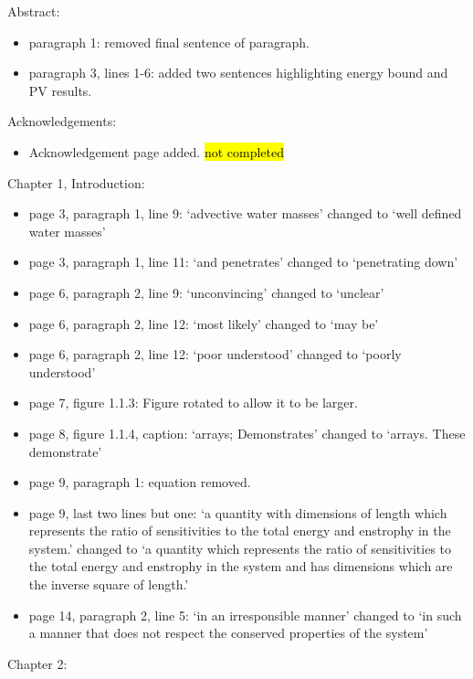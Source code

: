 \documentclass[10pt,a4paper]{article}
\begin{document}
	
	
	Abstract:
	\begin{itemize}
		\item paragraph 1: removed final sentence of paragraph.
		
		\item paragraph 3, lines 1-6: added two sentences highlighting energy bound and PV results.  
	\end{itemize}
	
	Acknowledgements:
	\begin{itemize}
		\item Acknowledgement page added. \hl{not completed}
	\end{itemize}
	
	Chapter 1, Introduction:
	\begin{itemize}
		\item page 3, paragraph 1, line 9: `advective water masses' changed to `well
		defined water masses'
		\item page 3, paragraph 1, line 11: `and penetrates'  changed to `penetrating down'
		\item page 6, paragraph 2, line 9:  `unconvincing' changed to `unclear'
		\item page 6, paragraph 2, line 12:  `most likely' changed to `may be'
		\item page 6, paragraph 2, line 12:  `poor understood' changed to `poorly understood'
		\item page 7, figure 1.1.3: Figure rotated to allow it to be larger.
		\item page 8, figure 1.1.4, caption: `arrays; Demonstrates' changed to `arrays. These demonstrate'
		\item page 9, paragraph 1: equation removed.
		\item page 9, last two lines but one:
		`a quantity with dimensions of length which represents the ratio of sensitivities to the total energy and enstrophy in the system.'
		changed to
		`a quantity which represents the ratio of 
		sensitivities to the total energy and enstrophy in the system and has
		dimensions which are the inverse square of length.'
		\item page 14, paragraph 2, line 5: `in an irresponsible manner' changed to `in such a manner that does not respect the conserved properties of the system'
	\end{itemize}
	Chapter 2:
\end{document}
